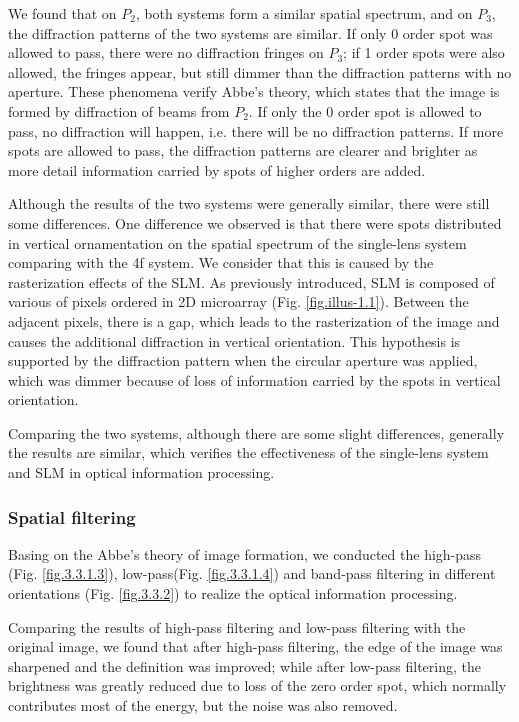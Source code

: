 \documentclass[10pt,a4paper,twocolumn,twoside,UTF8]{article}
\begin{document}
		We found that on $P_2$, both systems form a similar spatial spectrum, and on $P_3$, the diffraction patterns of the two systems are similar.
		If only 0 order spot was allowed to pass, there were no diffraction fringes on $P_3$; if 1 order spots were also allowed, the fringes appear, but still dimmer than the diffraction patterns with no aperture. 
		These phenomena verify Abbe's theory, which states that the image is formed by diffraction of beams from $P_2$. 
		If only the 0 order spot is allowed to pass, no diffraction will happen, i.e. there will be no diffraction patterns.
		If more spots are allowed to pass, the diffraction patterns are clearer and brighter as more detail information carried by spots of higher orders are added.
		
		Although the results of the two systems were generally similar, there were still some differences.
		One difference we observed is that there were spots distributed in vertical ornamentation on the spatial spectrum of the single-lens system comparing with the 4f system.
		We consider that this is caused by the rasterization effects of the SLM. As previously introduced, SLM is composed of various of pixels ordered in 2D microarray (Fig. \ref{fig.illus-1.1}).
		Between the adjacent pixels, there is a gap, which leads to the rasterization of the image and causes the additional diffraction in vertical orientation.
		This hypothesis is supported by the diffraction pattern when the circular aperture was applied, which was dimmer because of loss of information carried by the spots in vertical orientation.

		Comparing the two systems, although there are some slight differences, generally the results are similar, which verifies the effectiveness of the single-lens system and SLM in optical information processing.

		\subsubsection{Spatial filtering}
		Basing on the Abbe's theory of image formation, we conducted the high-pass (Fig. \ref{fig.3.3.1.3}), low-pass(Fig. \ref{fig.3.3.1.4}) and band-pass filtering in different orientations (Fig. \ref{fig.3.3.2}) to realize the optical information processing.
		
		Comparing the results of high-pass filtering and low-pass filtering with the original image, we found that after high-pass filtering, the edge of the image was sharpened and the definition was improved;
		while after low-pass filtering, the brightness was greatly reduced due to loss of the zero order spot, which normally contributes most of the energy, but the noise was also removed.
		
\end{document}
